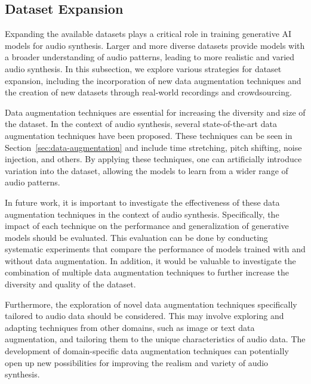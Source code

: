 



\subsection{Dataset Expansion}

Expanding the available datasets plays a critical role in training generative \ac{AI} models for audio synthesis. Larger and more diverse datasets provide models with a broader understanding of audio patterns, leading to more realistic and varied audio synthesis. In this subsection, we explore various strategies for dataset expansion, including the incorporation of new data augmentation techniques and the creation of new datasets through real-world recordings and crowdsourcing.

Data augmentation techniques are essential for increasing the diversity and size of the dataset. In the context of audio synthesis, several state-of-the-art data augmentation techniques have been proposed. These techniques can be seen in Section~\ref{sec:data-augmentation} and include time stretching, pitch shifting, noise injection, and others. By applying these techniques, one can artificially introduce variation into the dataset, allowing the models to learn from a wider range of audio patterns.

In future work, it is important to investigate the effectiveness of these data augmentation techniques in the context of audio synthesis. Specifically, the impact of each technique on the performance and generalization of generative models should be evaluated. This evaluation can be done by conducting systematic experiments that compare the performance of models trained with and without data augmentation. In addition, it would be valuable to investigate the combination of multiple data augmentation techniques to further increase the diversity and quality of the dataset.

Furthermore, the exploration of novel data augmentation techniques specifically tailored to audio data should be considered. This may involve exploring and adapting techniques from other domains, such as image or text data augmentation, and tailoring them to the unique characteristics of audio data. The development of domain-specific data augmentation techniques can potentially open up new possibilities for improving the realism and variety of audio synthesis.

